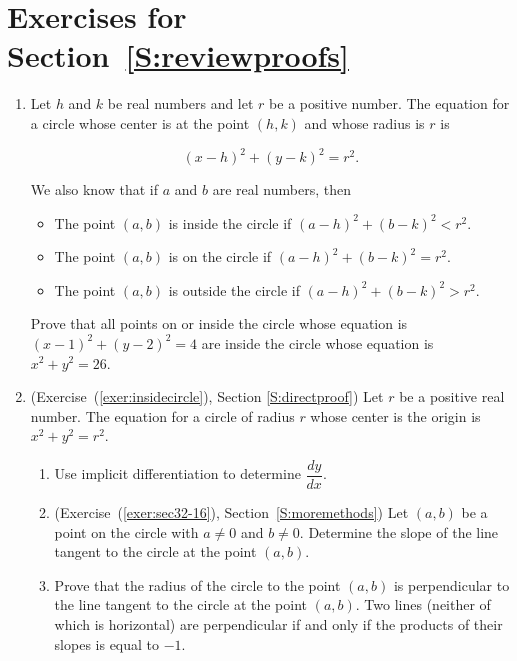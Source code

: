 \section*{Exercises for Section~\ref{S:reviewproofs}}
\begin{enumerate}
  \item Let $h$ and $k$ be real numbers and let $r$ be a positive number.  The equation for a circle whose center is at the point $\left( h, k \right)$ and whose radius is $r$ is
\label{exer:circle-31}%

\[
\left( x - h \right)^2 + \left( y - k \right)^2 = r^2.
\]

\noindent
We also know that if $a$ and $b$ are real numbers, then

\begin{itemize}
\item The point $\left( a, b \right)$ is inside the circle if 
$\left( a - h \right)^2 + \left( b - k \right)^2 < r^2$.
\item The point $\left( a, b \right)$ is on the circle if 
$\left( a - h \right)^2 + \left( b - k \right)^2 = r^2$.
\item The point $\left( a, b \right)$ is outside the circle if 
$\left( a - h \right)^2 + \left( b - k \right)^2 > r^2$.
\end{itemize}

\noindent
Prove that all points on or inside the circle whose equation is 
$\left( x - 1 \right)^2 + \left( y - 2 \right)^2 = 4$ are inside the circle whose equation is 
$x^2 + y^2 = 26$.


\item (Exercise~(\ref{exer:insidecircle}), Section \ref{S:directproof}) Let $r$ be a positive real number. The equation for a circle of radius $r$ whose center is the origin is $x^2 + y^2 = r^2$.
\begin{enumerate}
\item Use implicit differentiation to determine $\dfrac{dy}{dx}$.

\item (Exercise~(\ref{exer:sec32-16}), Section~\ref{S:moremethods}) Let $\left(a, b \right)$ be a point on the circle with $a \ne 0$ and $b \ne 0$.  Determine the slope of the line tangent to the circle at the point $\left(a, b \right)$.

\item Prove that the radius of the circle to the point $\left(a, b \right)$ is perpendicular to the line tangent to the circle at the point $\left(a, b \right)$. \hint Two lines (neither of which is horizontal) are perpendicular if and only if the products of their slopes is equal to $-1$.
\end{enumerate}



\end{enumerate}

